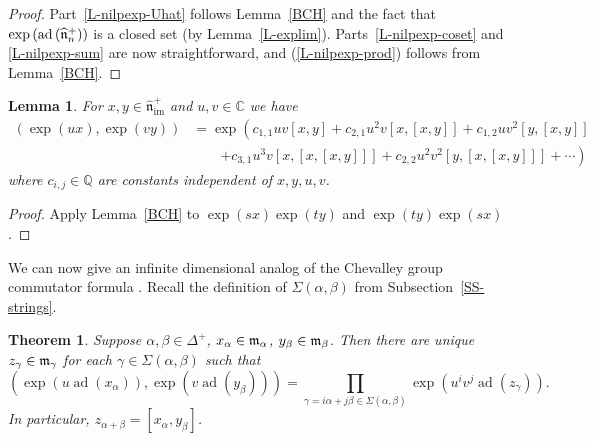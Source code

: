 \documentclass[11pt,letterpaper]{amsart}
\newcounter{thecounter}
\numberwithin{thecounter}{section}
\newtheorem{lemma}[thecounter]{Lemma}
\newtheorem{theorem}[thecounter]{Theorem}
\theoremstyle{definition}
\DeclareMathOperator{\ad}{ad}
\DeclareMathOperator{\im}{{im}}
\renewcommand{\a}{\alpha}
\renewcommand{\b}{\beta}
\newcommand{\g}{\gamma}
\newcommand{\C}{{\mathbb C}}
\newcommand{\Q}{{\mathbb Q}}
\newcommand{\nhimp}{{\widehat{\mathfrak{n}}_{\im}^+}}
\begin{document}
\begin{shortver}
\begin{proof}
Part~\eqref{L-nilpexp-Uhat} follows Lemma~\ref{BCH} and the fact that
 $\exp\left(\ad\left(\widehat{\frak n}^+_n\right)\right)$ is a closed set (by
 Lemma~\ref{L-explim}).
 Parts~\eqref{L-nilpexp-coset} and \eqref{L-nilpexp-sum} are now straightforward, and (\ref{L-nilpexp-prod}) follows from Lemma~\ref{BCH}.
\end{proof}
\end{shortver}

\begin{lemma}\label{BCHcomm} For $x,y\in\nhimp$ and $u,v\in\C$ we have
\begin{align*}
\left(\exp(ux),\exp(vy)\right)&=\exp\left(c_{1,1}uv[x,y]+c_{2,1}u^2v[x,[x,y]]+c_{1,2}uv^2[y,[x,y]]\right. \\
&\qquad\left. +c_{3,1}u^3v[x,[x,[x,y]]]+c_{2,2}u^2v^2[y,[x,[x,y]]]+\cdots \right)
\end{align*}
where $c_{i,j}\in\Q$ are constants independent of $x,y,u,v$.
\end{lemma}
\begin{proof} Apply Lemma~\ref{BCH} to $\exp(sx)\exp(ty)$ and $\exp(ty)\exp(sx)$.
\end{proof}


We can now give an infinite dimensional analog of the Chevalley group commutator formula \cite{St}.
Recall the definition of $\Sigma(\a,\b)$ from Subsection~\ref{SS-strings}. 
\begin{theorem}\label{T-commrel}
Suppose $\a,\b\in\Delta^+$, $x_{\a}\in{\frak m}_{\a}$, $y_{\b}\in{\frak m}_{\b}$. Then there are unique $z_{\g}\in{\frak m}_{\g}$ for each
$\g\in\Sigma(\a,\b)$ such that
$$\left(\exp\left(u\ad\left(x_{\a}\right)\right),\exp\left(v\ad\left(y_{\b}\right)\right)\right) =\prod_{\g=i\a+j\b\in\Sigma(\a,\b)} \exp\left(u^i v^j\ad\left(z_{\g}\right)\right).$$
In particular, $z_{\a+\b}=\left[x_{\a},y_{\b}\right]$.
\end{theorem}
\end{document}
